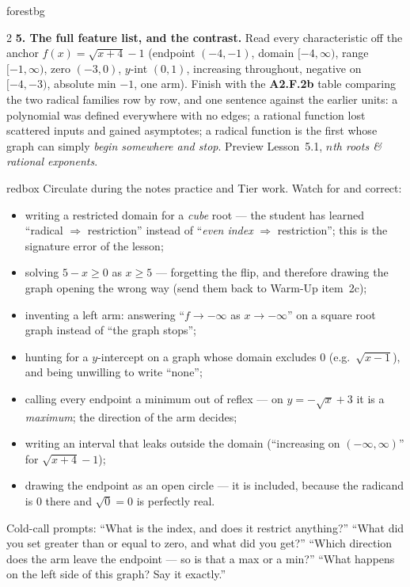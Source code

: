 \documentclass[10pt]{article}
\begin{document}
\begin{skillbox}[Lesson]{forestbg}
\begin{multicols}{2}
\textbf{5. The full feature list, and the contrast.} Read every characteristic off the anchor
$f(x)=\sqrt{x+4}-1$ (endpoint $(-4,-1)$, domain $[-4,\infty)$, range $[-1,\infty)$, zero $(-3,0)$,
$y$-int $(0,1)$, increasing throughout, negative on $[-4,-3)$, absolute min $-1$, one arm). Finish
with the \textbf{A2.F.2b} table comparing the two radical families row by row, and one sentence
against the earlier units: a polynomial was defined everywhere with no edges; a rational function lost
scattered inputs and gained asymptotes; a radical function is the first whose graph can simply
\emph{begin somewhere and stop}. Preview Lesson~5.1, \emph{$n$th roots \& rational exponents}.
\end{multicols}
\end{skillbox}

\begin{skillbox}{redbox}
Circulate during the notes practice and Tier work. Watch for and correct:
\begin{itemize}[leftmargin=1.2em, nosep]
  \item writing a restricted domain for a \emph{cube} root --- the student has learned ``radical $\Rightarrow$ restriction'' instead of ``\emph{even index} $\Rightarrow$ restriction''; this is the signature error of the lesson;
  \item solving $5-x\ge0$ as $x\ge5$ --- forgetting the flip, and therefore drawing the graph opening the wrong way (send them back to Warm-Up item~2c);
  \item inventing a left arm: answering ``$f\to-\infty$ as $x\to-\infty$'' on a square root graph instead of ``the graph stops'';
  \item hunting for a $y$-intercept on a graph whose domain excludes $0$ (e.g.\ $\sqrt{x-1}$), and being unwilling to write ``none'';
  \item calling every endpoint a minimum out of reflex --- on $y=-\sqrt{x}+3$ it is a \emph{maximum}; the direction of the arm decides;
  \item writing an interval that leaks outside the domain (``increasing on $(-\infty,\infty)$'' for $\sqrt{x+4}-1$);
  \item drawing the endpoint as an open circle --- it is included, because the radicand is $0$ there and $\sqrt{0}=0$ is perfectly real.
\end{itemize}
Cold-call prompts: ``What is the index, and does it restrict anything?'' ``What did you set greater
than or equal to zero, and what did you get?'' ``Which direction does the arm leave the endpoint --- so
is that a max or a min?'' ``What happens on the left side of this graph? Say it exactly.''
\end{skillbox}
\end{document}
